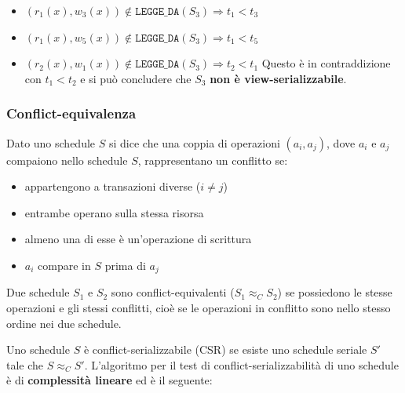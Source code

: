 \documentclass[a4paper]{article}
\begin{document}
\begin{Example}{}{}
\begin{itemize}
\begin{itemize}
         \item \( (r_1(x), w_3(x)) \notin \texttt{LEGGE\_DA}(S_3) \Rightarrow
           t_1 < t_3 \)

         \item \( (r_1(x), w_5(x)) \notin \texttt{LEGGE\_DA}(S_3) \Rightarrow
           t_1 < t_5 \)

         \item \( (r_2(x), w_1(x)) \notin \texttt{LEGGE\_DA}(S_3) \Rightarrow
           t_2 < t_1 \) Questo è in contraddizione con \( t_1 < t_2 \)
           e si può concludere che \( S_3 \) \textbf{non è view-serializzabile}.
       \end{itemize}
  \end{itemize}
\end{Example}

\subsubsection{Conflict-equivalenza}

{
  Dato uno schedule \( S \) si dice che una coppia di operazioni \( (a_i, a_j) \),
  dove \( a_i \) e \( a_j \) compaiono nello schedule \( S \), rappresentano un
  conflitto se:
  \begin{itemize}
    \item appartengono a transazioni diverse (\( i \neq j \))

    \item entrambe operano sulla stessa risorsa

    \item almeno una di esse è un'operazione di scrittura

    \item \( a_i \) compare in \( S \) prima di \( a_j \)
  \end{itemize}
}

{
  Due schedule \( S_1 \) e \( S_2 \) sono conflict-equivalenti (\( S_1 \approx_C S_2 \))
  se possiedono le stesse operazioni e gli stessi conflitti, cioè se le operazioni
  in conflitto sono nello stesso ordine nei due schedule.
}

{
  Uno schedule \( S \) è conflict-serializzabile (CSR) se esiste uno schedule seriale
  \( S' \) tale che \( S \approx_C S' \).
}
\noindent
L'algoritmo per il test di conflict-serializzabilità di uno schedule è di \textbf{
complessità lineare} ed è il seguente:
\end{document}
